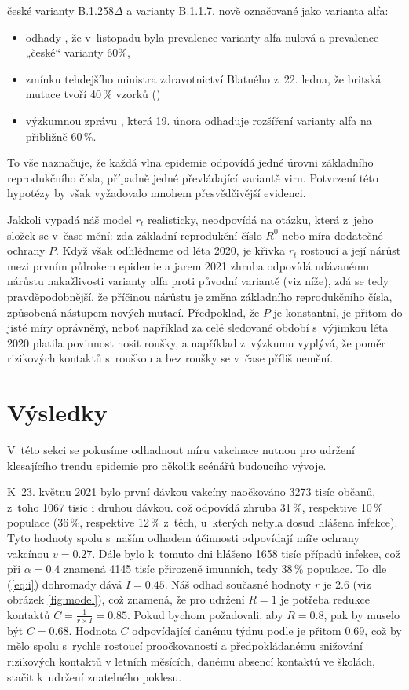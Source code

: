 české varianty B.1.258$\Delta$ a varianty B.1.1.7, nově označované jako varianta alfa:
\begin{itemize}
\item odhady \cite{brejova2021b}, že v~listopadu byla
prevalence varianty alfa nulová a prevalence „české“ varianty 60\%, 
\item zmínku tehdejšího ministra zdravotnictví Blatného z~22. ledna, že britská mutace tvoří 40\,\% vzorků (\cite{blatnybrigit})
\item výzkumnou zprávu \cite{diana}, která 19. února odhaduje rozšíření varianty alfa
na přibližně 60\,\%.
\end{itemize}
To vše naznačuje, že každá vlna epidemie odpovídá jedné úrovni základního reprodukčního čísla, případně jedné převládající variantě viru. Potvrzení této hypotézy by však vyžadovalo
mnohem přesvědčivější evidenci.

Jakkoli vypadá náš model $r_t$ realisticky, neodpovídá na otázku, která z~jeho složek se v~čase mění: zda základní reprodukční číslo $R^0$ nebo míra dodatečné ochrany $P$. Když však odhlédneme od léta 2020, je křivka $r_t$ rostoucí a její nárůst mezi prvním půlrokem epidemie a jarem 2021 zhruba odpovídá udávanému nárůstu nakažlivosti varianty alfa proti původní variantě (viz níže), zdá se tedy pravděpodobnější, že příčinou nárůstu je změna základního reprodukčního čísla, způsobená nástupem nových mutací. Předpoklad, že $P$ je konstantní, je přitom do jisté míry 
oprávněný, neboť například za celé sledované období s~výjimkou léta
2020 platila povinnost nosit roušky, a například z~výzkumu \cite{paqcovid}
vyplývá, že poměr rizikových kontaktů s~rouškou a bez roušky se
v~čase příliš nemění. 

\section*{Výsledky}

V~této sekci se pokusíme odhadnout míru vakcinace nutnou pro udržení
klesajícího trendu epidemie pro několik scénářů budoucího vývoje. 

K~23. květnu 2021 bylo první dávkou vakcíny naočkováno 3273 tisíc
občanů, z~toho 1067 tisíc i druhou dávkou. což odpovídá zhruba 31\,\%,
respektive 10\,\% populace (36\,\%, respektive 12\,\% z~těch, u~kterých nebyla
dosud hlášena infekce). Tyto hodnoty spolu s~naším odhadem účinnosti
odpovídají míře ochrany vakcínou $v=0.27$. Dále bylo k~tomuto dni
hlášeno 1658 tisíc případů infekce, což při $\alpha=0.4$ znamená
4145 tisíc přirozeně imunních, tedy 38\,\% populace. To dle (\ref{eq:i})
dohromady dává $I=0.45$. Náš odhad současné hodnoty $r$ je $2.6$ (viz obrázek \ref{fig:model}), což znamená, že pro udržení $R=1$ je potřeba redukce kontaktů
$C=\frac{1}{r\times I}=0.85$. Pokud bychom požadovali, aby $R=0.8$,
pak by muselo být $C=0.68$. Hodnota $C$ odpovídající danému týdnu
podle \cite{paqcovid} je přitom 0.69, což by mělo spolu
s~rychle rostoucí proočkovaností a předpokládanému snižování rizikových kontaktů v letních měsících, danému absencí kontaktů ve školách, stačit k~udržení znatelného poklesu.

